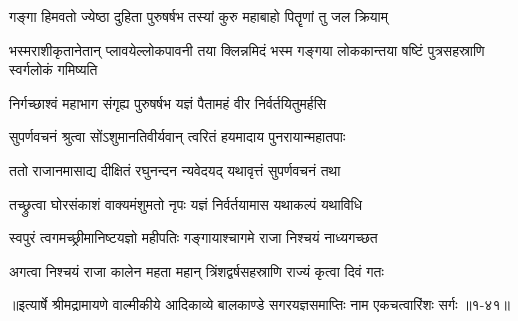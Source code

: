 \twolineshloka
{गङ्गा हिमवतो ज्येष्ठा दुहिता पुरुषर्षभ}
{तस्यां कुरु महाबाहो पितॄणां तु जल क्रियाम्} %

\threelineshloka
{भस्मराशीकृतानेतान् प्लावयेल्लोकपावनी}
{तया क्लिन्नमिदं भस्म गङ्गया लोककान्तया}
{षष्टिं पुत्रसहस्राणि स्वर्गलोकं गमिष्यति} %

\twolineshloka
{निर्गच्छाश्वं महाभाग संगृह्य पुरुषर्षभ}
{यज्ञं पैतामहं वीर निर्वर्तयितुमर्हसि} %

\twolineshloka
{सुपर्णवचनं श्रुत्वा सोंऽशुमानतिवीर्यवान्}
{त्वरितं हयमादाय पुनरायान्महातपाः} %

\twolineshloka
{ततो राजानमासाद्य दीक्षितं रघुनन्दन}
{न्यवेदयद् यथावृत्तं सुपर्णवचनं तथा} %

\twolineshloka
{तच्छ्रुत्वा घोरसंकाशं वाक्यमंशुमतो नृपः}
{यज्ञं निर्वर्तयामास यथाकल्पं यथाविधि} %

\twolineshloka
{स्वपुरं त्वगमच्छ्रीमानिष्टयज्ञो महीपतिः}
{गङ्गायाश्चागमे राजा निश्चयं नाध्यगच्छत} %

\twolineshloka
{अगत्वा निश्चयं राजा कालेन महता महान्}
{त्रिंशद्वर्षसहस्राणि राज्यं कृत्वा दिवं गतः} %


॥इत्यार्षे श्रीमद्रामायणे वाल्मीकीये आदिकाव्ये बालकाण्डे सगरयज्ञसमाप्तिः नाम एकचत्वारिंशः सर्गः ॥१-४१॥
